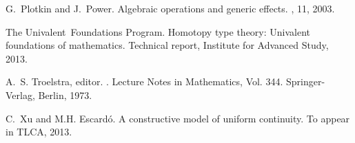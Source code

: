 \documentclass{entcs} \usepackage{prentcsmacro}
\begin{document}
\begin{thebibliography}{10}
G.~Plotkin and J.~Power.
\newblock Algebraic operations and generic effects.
, 11, 2003.

The Univalent~Foundations Program.
\newblock Homotopy type theory: Univalent foundations of mathematics.
\newblock Technical report, Institute for Advanced Study, 2013.

A.~S. Troelstra, editor.
.
\newblock Lecture Notes in Mathematics, Vol. 344. Springer-Verlag, Berlin,
  1973.

C.~Xu and M.H. Escard\'o.
\newblock A constructive model of uniform continuity.
\newblock To appear in TLCA, 2013.

\end{thebibliography}
\end{document}
